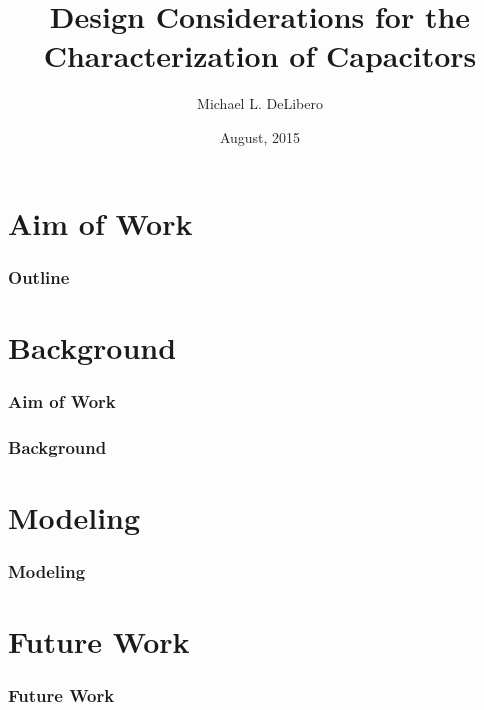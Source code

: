 \documentclass{beamer}
\title{Design Considerations for the Characterization of Capacitors}
\author{Michael L. DeLibero}
\date{August, 2015}
\institute[CWRU]{Case Western Reserve University}
\begin{document}
\begin{frame}
    \titlepage
\end{frame}

\section{Aim of Work}

\begin{frame}
  \frametitle{Outline}
  \tableofcontents
\end{frame}

\section{Background}
\begin{frame}
    \frametitle{Aim of Work}
\end{frame}

\begin{frame}
    \frametitle{Background}
\end{frame}




\section{Modeling}
\begin{frame}
    \frametitle{Modeling}
\end{frame}

\section{Future Work}
\begin{frame}
    \frametitle{Future Work}
\end{frame}


\end{document}
